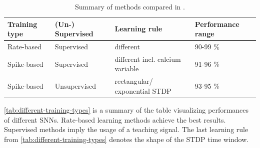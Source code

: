 \begin{table}[]
    \caption{Summary of methods compared in \cite{SNN}.}
    \begin{tabular}{|l|l|l|l|}
    \hline
    \textbf{Training type} & \textbf{(Un-) Supervised}    & \textbf{Learning rule}               & \textbf{Performance range} \\ \hline
    Rate-based             & Supervised                   & different                            & 90-99 \%                   \\ \hline
    Spike-based            & Supervised                   & different incl. calcium variable & 91-96 \%                   \\ \hline
    Spike-based            & Unsupervised                 & rectangular/ exponential \ac{STDP}        & 93-95 \%                   \\ \hline
    \end{tabular}
    \label{tab:different-training-types}
\end{table}

\autoref{tab:different-training-types} is a summary of the table visualizing performances of different \acp{SNN}.
Rate-based learning methods achieve the best results.
Supervised methods imply the usage of a teaching signal.
The last learning rule from \autoref{tab:different-training-types} denotes the shape of the \ac{STDP} time window.